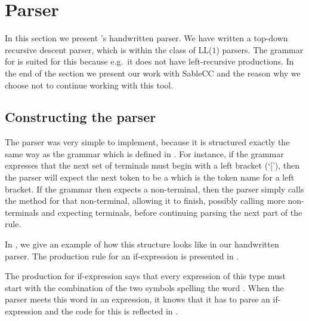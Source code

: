\section{Parser}
\label{sec:parserimplementation}

In this section we present \productname{}'s handwritten parser. We have
written a top-down recursive descent parser, which is within the class
of LL($1$) parsers. The grammar for \productname{} is suited for this
because e.g.\ it does not have left-recursive productions. In the end of
the section we present our work with SableCC and the reason why we choose
not to continue working with this tool.

\subsection{Constructing the parser}
The parser was very simple to implement, because it is structured exactly the same way as the
grammar which is defined in . For instance, if the grammar
expresses that the next set of terminals must begin with a left bracket (`['),
  then the parser will expect the next token to be a  which
  is the token name for a left bracket. If the grammar then expects a
  non-terminal, then the parser simply calls the method for that non-terminal,
  allowing it to finish, possibly calling more non-terminals and expecting
  terminals, before continuing parsing the next part of the rule.

In , we give an example of how this structure looks like in
our handwritten parser. The production rule for an if-expression is presented in
.


The production for if-expression says that every expression of this type
must start with the combination of the two symbols spelling the word
. When the parser meets this word in an expression, it knows
that it has to parse an if-expression and the code for this is reflected
in .



